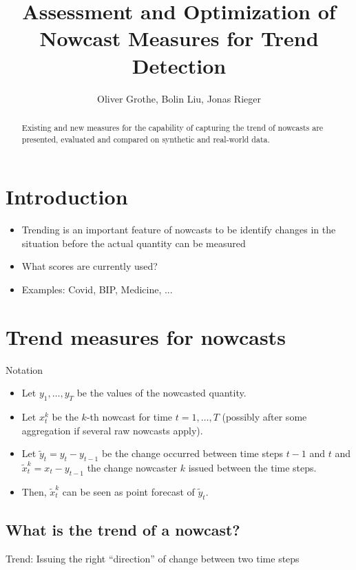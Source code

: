 \documentclass[oneside]{article}
\title{Assessment and Optimization of Nowcast Measures for Trend Detection}
\author{Oliver Grothe, Bolin Liu, Jonas Rieger}
\theoremstyle{plain}%
\theoremstyle{definition}
\newcommand{\ydiff}{\tilde{y}}
\newcommand{\xdiff}{\tilde{x}}
\begin{document}
\maketitle

\begin{abstract}
Existing and new measures for the capability of capturing the trend of nowcasts are presented, evaluated and compared on synthetic and real-world data.
\end{abstract}

\section{Introduction}

\begin{itemize}
	\item Trending is an important feature of nowcasts to be identify changes in the situation before the actual quantity can be measured
	\item What scores are currently used?
	\item Examples: Covid, BIP, Medicine, ... 
\end{itemize}

\section{Trend measures for nowcasts}

Notation
\begin{itemize}
  \item Let $y_1, \ldots, y_T$ be the values of the nowcasted quantity.
  \item Let $x_t^k$ be the $k$-th nowcast for time $t = 1, \ldots, T$ (possibly after some aggregation if several raw nowcasts apply).
  \item Let $\ydiff_t = y_t - y_{t-1}$ be the change occurred between time steps $t-1$ and $t$ and $\xdiff_t^k = x_t - y_{t-1}$ the change nowcaster $k$ issued between the time steps. 
  \item Then, $\xdiff_t^k$ can be seen as point forecast of $\ydiff_t$. 
\end{itemize}


\subsection{What is the trend of a nowcast?}

Trend: Issuing the right \enquote{direction} of change between two time steps
\end{document}

